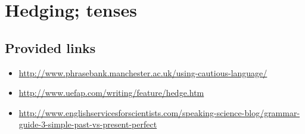 
\chapter{Hedging; tenses}

\section{Provided links}

\begin{itemize}
    \item \url{http://www.phrasebank.manchester.ac.uk/using-cautious-language/}
    \item \url{http://www.uefap.com/writing/feature/hedge.htm}
    \item \url{http://www.englishservicesforscientists.com/speaking-science-blog/grammar-guide-3-simple-past-vs-present-perfect}
\end{itemize}

